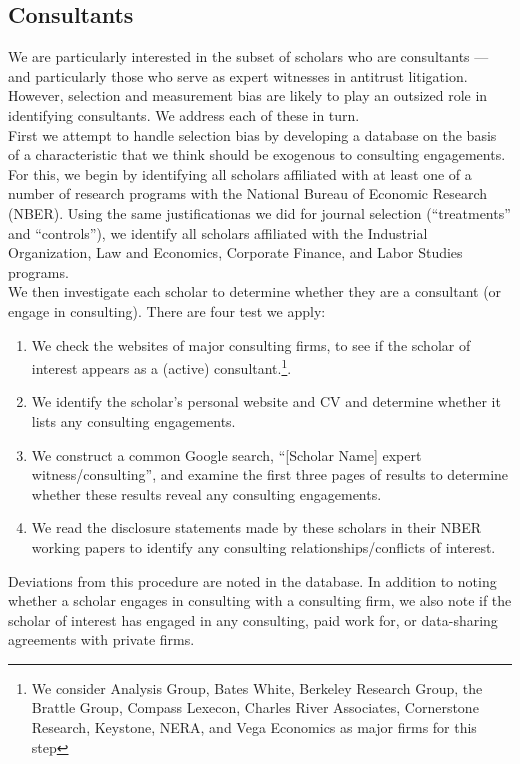 \documentclass[11pt, letterpaper, twoside]{article}
\begin{document}
\subsection{Consultants}
We are particularly interested in the subset of scholars who are consultants --- and particularly those who serve as expert witnesses in antitrust litigation. However, selection and measurement bias are likely to play an outsized role in identifying consultants. We address each of these in turn.\\

First we attempt to handle selection bias by developing a database on the basis of a characteristic that we think should be exogenous to consulting engagements. For this, we begin by identifying all scholars affiliated with at least one of a number of research programs with the National Bureau of Economic Research (NBER). Using the same justificationas we did for journal selection (``treatments'' and ``controls''), we identify all scholars affiliated with the Industrial Organization, Law and Economics, Corporate Finance, and Labor Studies programs.\\

We then investigate each scholar to determine whether they are a consultant (or engage in consulting). There are four test we apply:
\begin{enumerate}
    \item We check the websites of major consulting firms, to see if the scholar of interest appears as a (active) consultant.\footnote{We consider Analysis Group, Bates White, Berkeley Research Group, the Brattle Group, Compass Lexecon, Charles River Associates, Cornerstone Research, Keystone, NERA, and Vega Economics as major firms for this step}. 
    \item We identify the scholar's personal website and CV and determine whether it lists any consulting engagements. 
    \item We construct a common Google search, ``[Scholar Name] expert witness/consulting'', and examine the first three pages of results to determine whether these results reveal any consulting engagements.
    \item We read the disclosure statements made by these scholars in their NBER working papers to identify any consulting relationships/conflicts of interest.
\end{enumerate}
Deviations from this procedure are noted in the database. In addition to noting whether a scholar engages in consulting with a consulting firm, we also note if the scholar of interest has engaged in any consulting, paid work for, or data-sharing agreements with private firms.\\
\end{document}
